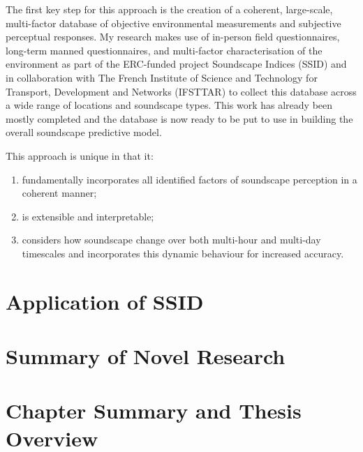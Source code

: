     The first key step for this approach is the creation of a coherent, large-scale, multi-factor database of objective environmental measurements and subjective perceptual responses. My research makes use of in-person field questionnaires, long-term manned questionnaires, and multi-factor characterisation of the environment as part of the ERC-funded project Soundscape Indices (SSID) and in collaboration with The French Institute of Science and Technology for Transport, Development and Networks (IFSTTAR) to collect this database across a wide range of locations and soundscape types. This work has already been mostly completed and the database is now ready to be put to use in building the overall soundscape predictive model.

    This approach is unique in that it:
    \begin{enumerate}
        \item fundamentally incorporates all identified factors of soundscape perception in a coherent manner;
        \item is extensible and interpretable;
        \item considers how soundscape change over both multi-hour and multi-day timescales and incorporates this dynamic behaviour for increased accuracy.
    \end{enumerate}

\section{Application of SSID}

\section{Summary of Novel Research}

\section{Chapter Summary and Thesis Overview}

